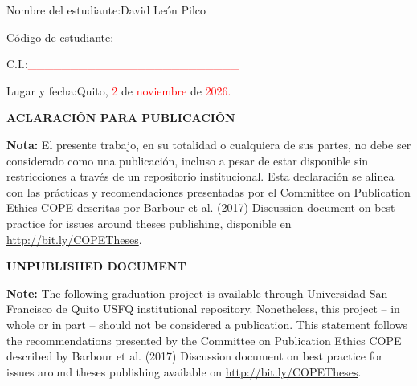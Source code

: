 \documentclass[journal]{IEEEtran}
\newenvironment{customfontsize}{
    \fontsize{12}{14}\selectfont
}{}
\begin{document}
\begin{customfontsize}
\vspace{30pt}

Nombre del estudiante:\hspace{4cm}David León Pilco\\
\vspace{30pt}

Código de estudiante:\hspace{4.2cm}\textcolor{red}{\_\_\_\_\_\_\_\_\_\_\_\_\_\_\_\_\_\_\_\_\_\_\_\_\_}\\
\vspace{30pt}

C.I.:\hspace{7.3cm}\textcolor{red}{\_\_\_\_\_\_\_\_\_\_\_\_\_\_\_\_\_\_\_\_\_\_\_\_\_}\\
\vspace{30pt}

Lugar y fecha:\hspace{5.4cm}Quito, \textcolor{red}{2} de \textcolor{red}{noviembre} de \textcolor{red}{2026.}

\end{customfontsize}


\newpage

\begin{center}
\textbf{\fontsize{14}{16}\selectfont ACLARACIÓN PARA PUBLICACIÓN}\\
\end{center}
\vspace{10pt}

\fontsize{12}{14}\selectfont \textbf{Nota:} El presente trabajo, en su totalidad o cualquiera de sus partes, no debe ser considerado como una publicación, incluso a pesar de estar disponible sin restricciones a través de un repositorio institucional. Esta declaración se alinea con las prácticas y recomendaciones presentadas por el Committee on Publication Ethics COPE descritas por Barbour et al. (2017) Discussion document on best practice for issues around theses publishing, disponible en \url{http://bit.ly/COPETheses}.
\vspace{10pt}
\begin{center}
\textbf{\fontsize{14}{16}\selectfont UNPUBLISHED DOCUMENT}\\
\end{center}
\vspace{10pt}
\fontsize{12}{14}\selectfont \textbf{Note:} The following graduation project is available through Universidad San Francisco de Quito USFQ institutional repository. Nonetheless, this project -- in whole or in part -- should not be considered a publication. This statement follows the recommendations presented by the Committee on Publication Ethics COPE described by Barbour et al. (2017) Discussion document on best practice for issues around theses publishing available on \url{http://bit.ly/COPETheses}.
\end{document}
